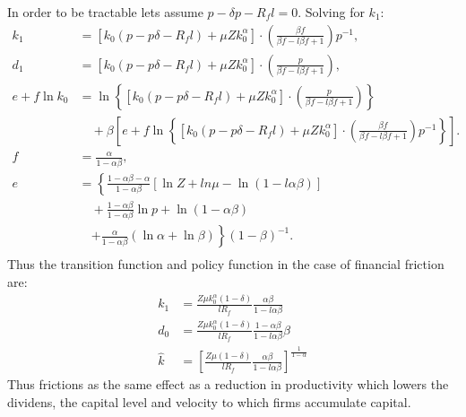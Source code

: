 \documentclass[12pt]{article}
\begin{document}
In order to be tractable lets assume \(p - \delta p - R_f l=0\).
Solving for \(k_1\):
\begin{align}
    k_1 &= \left[k_0\left(p-p\delta-R_f l\right)+ \mu Zk_0^{\alpha}\right]\cdot \left(\frac{ \beta f}{\beta f - l\beta f +1}\right)p^{-1},\\
    d_1 &= \left[k_0\left(p-p\delta-R_f l\right) + \mu Zk_0^{\alpha}\right]\cdot \left(\frac{p}{\beta f - l\beta f +1}\right),\\
    e + f \ln k_0 &= \ln \left\{\left[k_0\left(p-p\delta-R_f l\right) + \mu Zk_0^{\alpha}\right]\cdot \left(\frac{p}{\beta f - l\beta f +1}\right)\right\} \nonumber \\
    &\quad + \beta \left[e + f \ln \left\{\left[k_0\left(p-p\delta-R_f l\right) + \mu Zk_0^{\alpha}\right]\cdot \left(\frac{ \beta f}{\beta f - l\beta f +1}\right)p^{-1}\right\}\right].\\
    f &= \frac{\alpha}{1 - \alpha \beta},\\
    e &= \left\{\frac{1 - \alpha \beta - \alpha}{1 - \alpha \beta}\left[\ln{Z} +ln{\mu} - \ln\left(1 - l\alpha \beta\right)\right] \right. \nonumber \\
      &\quad + \frac{1 - \alpha \beta}{1 - \alpha \beta} \ln p + \ln\left(1 - \alpha \beta\right) \nonumber \\
      &\quad \left. + \frac{\alpha}{1 - \alpha \beta} (\ln \alpha + \ln \beta) \right\}(1 - \beta)^{-1}. \\
\end{align}
Thus the transition function and policy function in the case of financial friction are:
\begin{align}
    k_1 &= \frac{Z \mu k_0^{\alpha}{\left(1-\delta\right)}}{l R_f}\frac{\alpha\beta}{1-l\alpha\beta} \\
    d_0 &= \frac{Z \mu k_0^{\alpha}{\left(1-\delta\right)}}{l R_f}\frac{1-\alpha\beta}{1-l\alpha\beta}\beta \\
    \widehat{k}&=\left[\frac{Z \mu  {\left(1-\delta\right)}}{l R_f}\frac{\alpha\beta}{1-l\alpha\beta}\right]^{\frac{1}{1-\alpha}}
\end{align}
Thus frictions as the same effect as a reduction in productivity which lowers the dividens, the capital level and
velocity to which firms accumulate capital.
\end{document}

